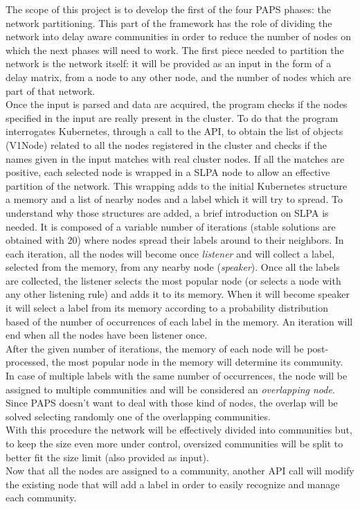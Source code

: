 The scope of this project is to develop the first of the four PAPS phases: the network 
partitioning. This part of the framework has the role of dividing the network into 
delay aware communities in order to reduce the number of nodes on which the next phases
will need to work. The first piece needed to partition the network is the network itself:
it will be provided as an input in the form of a delay matrix, from a node to any other
node, and the number of nodes which are part of that network. \\ 
Once the input is parsed and data are acquired, the program checks if the nodes specified 
in the input are really present in the cluster. To do that the program interrogates 
Kubernetes, through a call to the API, to obtain the list of objects (V1Node) related to
all the nodes registered in the cluster and checks if the names given in the
input matches with real cluster nodes. If all the matches are positive, each selected 
node is wrapped in a SLPA \cite{SLPA} node to allow an effective partition of the network.
This wrapping adds to the initial Kubernetes structure a memory and a list of nearby 
nodes and a label which it will try to spread.
To understand why those structures are 
added, a brief introduction on SLPA is needed. It is composed of a variable number of 
iterations (stable solutions are obtained with 20) where nodes spread their labels 
around to their neighbors. In each iteration, all the nodes will become once 
\textit{listener} and will collect a label, selected from the memory, from any nearby 
node (\textit{speaker}). Once all the labels are collected, the listener selects the 
most popular node (or selects a node with any other listening rule) and adds it to its
memory. When it will become speaker it will select a label from its memory according 
to a probability distribution based of the number of occurrences of each label in the 
memory. An iteration will end when all the nodes have been listener once. \\
After the given number of iterations, the memory of each node will be post-processed, 
the most popular node in the memory will determine its community. In case of multiple
labels with the same number of occurrences, the node will be assigned to multiple 
communities and will be considered an \textit{overlapping node}. Since PAPS doesn't 
want to deal with those kind of nodes, the overlap will be solved selecting randomly 
one of the overlapping communities. \\
With this procedure the network will be effectively divided into communities but, 
to keep the size even more under control, oversized communities will be split to better
fit the size limit (also provided as input). \\
Now that all the nodes are assigned to a community, another API call will modify the
existing node that will add a label in order to easily recognize and manage each community.

